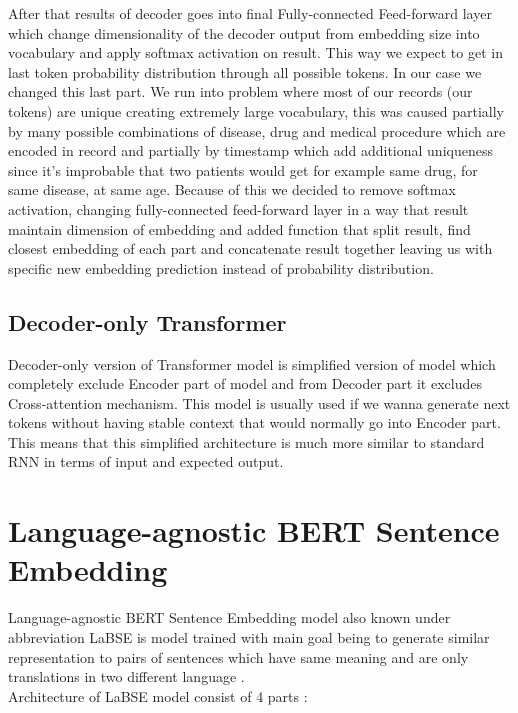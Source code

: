 After that results of decoder goes into final Fully-connected Feed-forward layer which change dimensionality of the decoder output from embedding size into vocabulary and apply softmax activation on result. This way we expect to get in last token probability distribution through all possible tokens. In our case we changed this last part. We run into problem where most of our records (our tokens) are unique creating extremely large vocabulary, this was caused partially by many possible combinations of disease, drug and medical procedure which are encoded in record and partially by timestamp which add additional uniqueness since it's improbable that two patients would get for example same drug, for same disease, at same age. Because of this we decided to remove softmax activation, changing fully-connected feed-forward layer in a way that result maintain dimension of embedding and added function that split result, find closest embedding of each part and concatenate result together leaving us with specific new embedding prediction instead of probability distribution.

\subsection{Decoder-only Transformer}

Decoder-only version of Transformer model is simplified version of model which completely exclude Encoder part of model and from Decoder part it excludes Cross-attention mechanism. This model is usually used if we wanna generate next tokens without having stable context that would normally go into Encoder part.
\\

This means that this simplified architecture is much more similar to standard RNN in terms of input and expected output.

\section{Language-agnostic BERT Sentence Embedding}
\label{theoryLaBSE}

Language-agnostic BERT Sentence Embedding model also known under abbreviation LaBSE is model trained with main goal being to generate similar representation to pairs of sentences which have same meaning and are only translations in two different language \cite{labse_kaggle}. 
\\

Architecture of LaBSE model consist of 4 parts \cite{labse_hug}:

